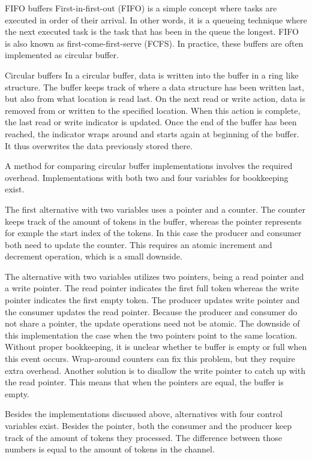\begin{homeworkProblem}
\label{sec:lid_stud} 

\begin{homeworkSection}{FIFO buffers}
	First-in-first-out (FIFO) is a simple concept where tasks are executed in order of their arrival. In other words, it is a queueing technique where the next executed task is the task that has been in the queue the longest. 
	FIFO is also known as first-come-first-serve (FCFS).
	In practice, these buffers are often implemented as circular buffer. 
\end{homeworkSection}

\begin{homeworkSection}{Circular buffers}
	In a circular buffer, data is written into the buffer in a ring like structure. The buffer keeps track of where a data structure has been written last, but also from what location is read last. 
	On the next read or write action, data is removed from or written to the specified location. 
	When this action is complete, the last read or write indicator is updated. 
	Once the end of the buffer has been reached, the indicator wraps around and starts again at beginning of the buffer. It thus overwrites the data previously stored there.


	A method for comparing circular buffer implementations involves the required overhead. Implementations with both two and four variables for bookkeeping exist. \cite{buffers} 

	The first alternative with two variables uses a pointer and a counter. The counter keeps track of the amount of tokens in the buffer, whereas the pointer represents for exmple the start index of the tokens. 
	In this case the producer and consumer both need to update the counter. This requires an atomic increment and decrement operation, which is a small downside. 

	The alternative with two variables utilizes two pointers, being a read pointer and a write pointer. 
	The read pointer indicates the first full token whereas the write pointer indicates the first empty token. 
	The producer updates write pointer and the consumer updates the read pointer. 
	Because the producer and consumer do not share a pointer, the update operations need not be atomic. The downside of this implementation 
	the case when the two pointers point to the same location. Without proper bookkeeping, it is unclear whether te buffer is empty or full when this event occurs. 
	Wrap-around counters can fix this problem, but they require extra overhead. Another solution is to disallow the write pointer to catch up with the read pointer. 
	This means that when the pointers are equal, the buffer is empty.

	Besides the implementations discussed above, alternatives with four control variables exist. 
	Besides the pointer, both the consumer and the producer keep track of the amount of tokens they processed. 
	The difference between those numbers is equal to the amount of tokens in the channel.
\end{homeworkSection}
\end{homeworkProblem}

